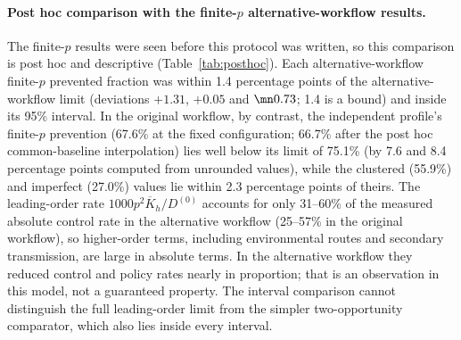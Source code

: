 \paragraph{Post hoc comparison with the finite-$p$ alternative-workflow results.}
The finite-$p$ results were seen before this protocol was written, so this
comparison is post hoc and descriptive (Table~\ref{tab:posthoc}). Each
alternative-workflow finite-$p$ prevented fraction was within 1.4 percentage
points of the alternative-workflow limit (deviations $+1.31$, $+0.05$ and
$\mn0.73$; 1.4 is a bound) and inside its 95\% interval. In the
original workflow, by contrast, the independent profile's finite-$p$ prevention
(67.6\% at the fixed configuration; 66.7\% after the post hoc common-baseline
interpolation) lies well below its limit of 75.1\% (by 7.6 and 8.4 percentage
points computed from unrounded values), while the clustered (55.9\%) and
imperfect (27.0\%) values lie within 2.3 percentage points of theirs. The leading-order rate
$1000p^2\overline K_h/D^{(0)}$ accounts for only 31--60\% of the measured
absolute control rate in the alternative workflow (25--57\% in the original
workflow), so higher-order terms, including environmental routes and secondary
transmission, are large in absolute terms. In the alternative workflow they
reduced control and policy rates nearly in proportion; that is an observation in
this model, not a guaranteed property. The interval comparison cannot
distinguish the full leading-order limit from the simpler two-opportunity
comparator, which also lies inside every interval.

